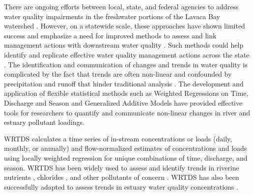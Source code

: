 \documentclass[fleqn,10pt,lineno]{wlpeerj} %
\providecommand{\DIFdelbegin}{} %
\providecommand{\DIFdelend}{} %
\begin{document}
There are ongoing efforts between local, state, and federal agencies to
address water quality impairments in the freshwater portions of the
Lavaca Bay watershed
\autocite{jainTechnicalSupportDocument2021,schrammLavacaRiverWatershed2018,bertholdDirectMailingEducation2021}.
However, on a statewide scale, these approaches have shown limited
success and emphasize a need for improved methods to assess and link
management actions with downstream water quality
\autocite{schrammTotalMaximumDaily2022}. \DIFdelbegin %
\DIFdelend Such methods could help
identify and replicate effective water quality management actions across
the state . The identification and communication of changes and trends
in water quality is complicated by the fact that trends are often
non-linear and confounded by precipitation and runoff that hinder
traditional analysis
\autocite{wazniakLinkingWaterQuality2007,lloydMethodsDetectingChange2014}.
The development and application of flexible statistical methods such as
Weighted Regressions on Time, Discharge and Season
\autocite[WRTDS,][]{hirschWeightedRegressionsTime2010} and Generalized
Additive Models \autocite[GAMs,][]{woodFastStableRestricted2011} have
provided effective tools for researchers to quantify and communicate
non-linear changes in river and estuary pollutant loadings.

WRTDS calculates a time series of in-stream concentrations or loads
(daily, monthly, or annually) and flow-normalized estimates of
concentrations and loads using locally weighted regression for unique
combinations of time, discharge, and season. WRTDS has been widely used
to assess and identify trends in riverine nutrients
\autocite{oelsner_recent_2019,stackpooleLongTermMississippi2021},
chlorides \autocite{stetsIncreasingChlorideRivers2018}, and other
pollutants of concern \autocite{shodaWaterqualityTrendsRivers2019}.
WRTDS has also been successfully adapted to assess trends in estuary
water quality concentrations \autocite{beckFourDecadesWater2018}.
\end{document}
